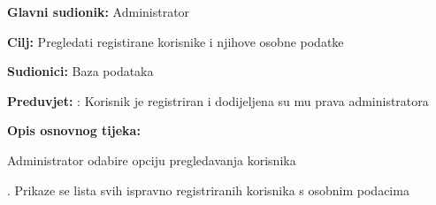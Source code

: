 			
				\noindent {}
				\begin{packed_item}
					
					\item \textbf{Glavni sudionik: }Administrator
					\item  \textbf{Cilj:} Pregledati registirane korisnike i njihove osobne podatke
					\item  \textbf{Sudionici:} Baza podataka
					\item  \textbf{Preduvjet:} : Korisnik je registriran i dodijeljena su mu prava administratora
					\item  \textbf{Opis osnovnog tijeka:}
					
					\item[] \begin{packed_enum}
						
						\item Administrator odabire opciju pregledavanja korisnika
						\item . Prikaze se lista svih ispravno registriranih korisnika s osobnim podacima
						
						
					\end{packed_enum}
					
				\end{packed_item}
				
				
				
				
				
